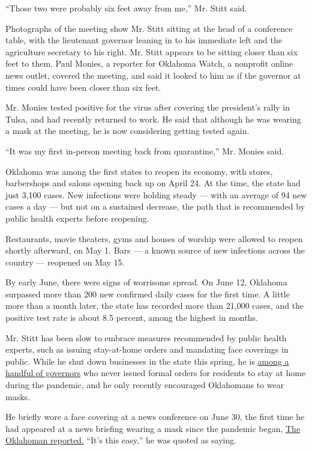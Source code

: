 ``Those two were probably six feet away from me,'' Mr. Stitt said.

Photographs of the meeting show Mr. Stitt sitting at the head of a
conference table, with the lieutenant governor leaning in to his
immediate left and the agriculture secretary to his right. Mr. Stitt
appears to be sitting closer than six feet to them. Paul Monies, a
reporter for Oklahoma Watch, a nonprofit online news outlet, covered the
meeting, and said it looked to him as if the governor at times could
have been closer than six feet.

Mr. Monies tested positive for the virus after covering the president's
rally in Tulsa, and had recently returned to work. He said that although
he was wearing a mask at the meeting, he is now considering getting
tested again.

``It was my first in-person meeting back from quarantine,'' Mr. Monies
said.

Oklahoma was among the first states to reopen its economy, with stores,
barbershops and salons opening back up on April 24. At the time, the
state had just 3,100 cases. New infections were holding steady --- with
an average of 94 new cases a day --- but not on a sustained decrease,
the path that is recommended by public health experts before reopening.

Restaurants, movie theaters, gyms and houses of worship were allowed to
reopen shortly afterward, on May 1. Bars --- a known source of new
infections across the country --- reopened on May 15.

By early June, there were signs of worrisome spread. On June 12,
Oklahoma surpassed more than 200 new confirmed daily cases for the first
time. A little more than a month later, the state has recorded more than
21,000 cases, and the positive test rate is about 8.5 percent, among the
highest in months.

Mr. Stitt has been slow to embrace measures recommended by public health
experts, such as issuing stay-at-home orders and mandating face
coverings in public. While he shut down businesses in the state this
spring, he is
\href{https://www.nytimes3xbfgragh.onion/2020/04/03/us/coronavirus-states-without-stay-home.html}{among
a handful of governors} who never issued formal orders for residents to
stay at home during the pandemic, and he only recently encouraged
Oklahomans to wear masks.

He briefly wore a face covering at a news conference on June 30, the
first time he had appeared at a news briefing wearing a mask since the
pandemic began,
\href{https://oklahoman.com/article/5665748/gov-kevin-stitt-urges-oklahomans-to-wear-masks-in-public}{The
Oklahoman reported.} ``It's this easy,'' he was quoted as saying.

